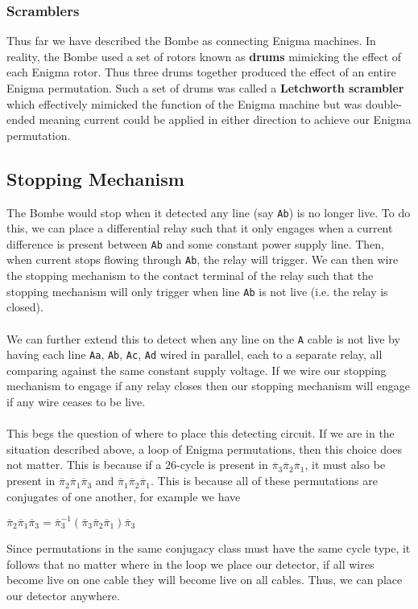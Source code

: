 \subsubsection{Scramblers}
Thus far we have described the Bombe as connecting Enigma machines.
In reality, the Bombe used a set of rotors known as {\bf{drums}}
mimicking the effect of each Enigma rotor. Thus three drums together
produced the effect of an entire Enigma permutation. Such a set of
drums was called a {\bf{Letchworth scrambler}} which effectively
mimicked the function of the Enigma machine but was double-ended
meaning current could be applied in either direction to achieve our
Enigma permutation.

\subsection{Stopping Mechanism}
The Bombe would stop when it detected
any line (say \texttt{Ab}) is no longer live. To do this, we can
place a differential
relay such that it only engages when a current difference is present
between \texttt{Ab} and some constant power supply line. Then, when
current stops
flowing through \texttt{Ab}, the relay will trigger. We can then wire the
stopping mechanism to the contact terminal of the relay such that the
stopping mechanism will only trigger when line \texttt{Ab} is not live (i.e.
the relay is closed).
\\\\We can further extend this to detect when any line on the \texttt{A}
cable is not live by having each line \texttt{Aa}, \texttt{Ab},
\texttt{Ac}, \texttt{Ad} wired in
parallel, each to a separate relay, all comparing against the same
constant supply voltage. If we wire our stopping mechanism to engage
if any relay closes
then our stopping mechanism will engage if any wire ceases to be live.
\\\\This begs the question of where to place this detecting circuit.
If we are in the situation described above, a loop of Enigma
permutations, then this choice does not matter. This is because if a
$26$-cycle is present in
$\overline\pi_3\overline\pi_2\overline\pi_1$, it must also
be present in
$\overline\pi_2\overline\pi_1\overline\pi_3$ and
$\overline\pi_1\overline\pi_2\overline\pi_1$. This is
because all of these permutations are conjugates of one another, for
example we have
\begin{center}
	$\overline\pi_2\overline\pi_1\overline\pi_3 =
		\overline\pi_3^{-1}(\overline\pi_3\overline\pi_2\overline\pi_1)\overline\pi_3$
\end{center}
Since permutations in the same conjugacy class must have the same
cycle type, it follows that no matter where in the loop we place our
detector, if all wires become live on one cable they will become live
on all cables. Thus, we can place our detector anywhere.

